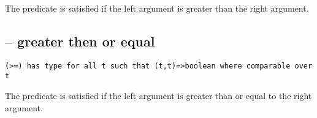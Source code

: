 The \q{>} predicate is satisfied if the left argument is greater than the right argument.

\subsection{\q{>=} -- greater then or equal}
\begin{lstlisting}
(>=) has type for all t such that (t,t)=>boolean where comparable over t
\end{lstlisting}

The \q{>=} predicate is satisfied if the left argument is greater than or equal to the right argument.
